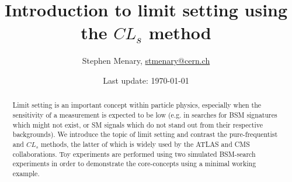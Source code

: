 \documentclass[a4paper,12pt]{article}
\begin{document}
\title{Introduction to limit setting using the $\textit{CL}_{s}$ method}
\author{Stephen Menary, \href{mailto:stmenary@cern.ch}{stmenary@cern.ch}}
\date{Last update: \today}
\maketitle

\begin{abstract}
Limit setting is an important concept within particle physics, especially when the sensitivity of a measurement is expected to be low (e.g. in searches for BSM signatures which might not exist, or SM signals which do not stand out from their respective backgrounds). We introduce the topic of limit setting and contrast the pure-frequentist and $\textit{CL}_s$ methods, the latter of which is widely used by the ATLAS and CMS collaborations. Toy experiments are performed using two simulated BSM-search experiments in order to demonstrate the core-concepts using a minimal working example.
\end{abstract}

\onehalfspace









% 


\printbibliography

\clearpage
\end{document}
